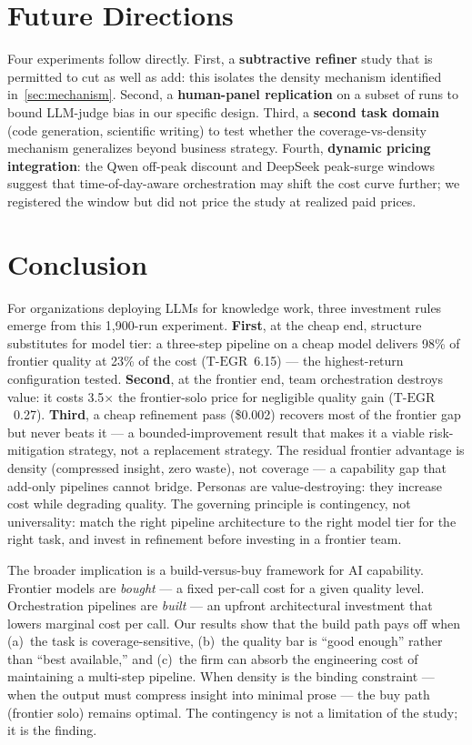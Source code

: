 \documentclass[12pt,a4paper]{article}
\newcommand{\TEGR}{\ensuremath{\text{T-EGR}}}
\begin{document}
\section{Future Directions}\label{sec:future}

Four experiments follow directly. First, a \textbf{subtractive refiner} study
that is permitted to cut as well as add: this isolates the density mechanism
identified in~\cref{sec:mechanism}. Second, a \textbf{human-panel replication}
on a subset of runs to bound LLM-judge bias in our specific design. Third, a
\textbf{second task domain} (code generation, scientific writing) to test
whether the coverage-vs-density mechanism generalizes beyond business strategy.
Fourth, \textbf{dynamic pricing integration}: the Qwen off-peak discount and
DeepSeek peak-surge windows suggest that time-of-day-aware orchestration may
shift the cost curve further; we registered the window but did not price the
study at realized paid prices.

\section{Conclusion}\label{sec:conclusion}

For organizations deploying LLMs for knowledge work, three investment rules
emerge from this 1{,}900-run experiment. \textbf{First}, at the cheap end,
structure substitutes for model tier: a three-step pipeline on a cheap model
delivers 98\% of frontier quality at 23\% of the cost ($\TEGR$~6.15) --- the
highest-return configuration tested. \textbf{Second}, at the frontier end, team
orchestration destroys value: it costs 3.5$\times$ the frontier-solo price for
negligible quality gain ($\TEGR$~0.27). \textbf{Third}, a cheap refinement pass
(\$0.002) recovers most of the frontier gap but never beats it --- a
bounded-improvement result that makes it a viable risk-mitigation strategy, not
a replacement strategy. The residual frontier advantage is density (compressed
insight, zero waste), not coverage --- a capability gap that add-only pipelines
cannot bridge. Personas are value-destroying: they increase cost while degrading
quality. The governing principle is contingency, not universality: match the
right pipeline architecture to the right model tier for the right task, and
invest in refinement before investing in a frontier team.

The broader implication is a build-versus-buy framework for AI capability.
Frontier models are \emph{bought} --- a fixed per-call cost for a given quality
level. Orchestration pipelines are \emph{built} --- an upfront architectural
investment that lowers marginal cost per call. Our results show that the build
path pays off when (a)~the task is coverage-sensitive, (b)~the quality bar is
``good enough'' rather than ``best available,'' and (c)~the firm can absorb the
engineering cost of maintaining a multi-step pipeline. When density is the
binding constraint --- when the output must compress insight into minimal prose
--- the buy path (frontier solo) remains optimal. The contingency is not a
limitation of the study; it is the finding.
\end{document}

